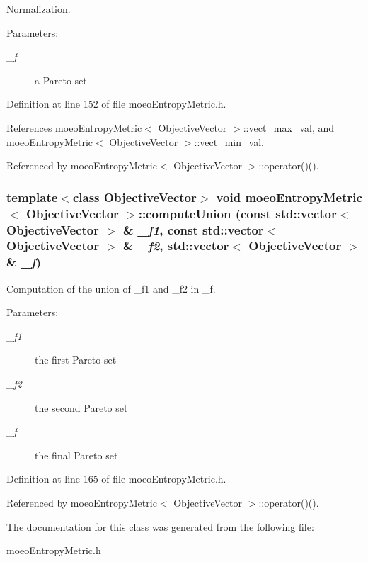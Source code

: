 Normalization. 

\begin{Desc}
\item[Parameters:]
\begin{description}
\item[{\em \_\-f}]a Pareto set \end{description}
\end{Desc}


Definition at line 152 of file moeo\-Entropy\-Metric.h.

References moeo\-Entropy\-Metric$<$ Objective\-Vector $>$::vect\_\-max\_\-val, and moeo\-Entropy\-Metric$<$ Objective\-Vector $>$::vect\_\-min\_\-val.

Referenced by moeo\-Entropy\-Metric$<$ Objective\-Vector $>$::operator()().
\subsubsection{\setlength{\rightskip}{0pt plus 5cm}template$<$class Objective\-Vector$>$ void \bf{moeo\-Entropy\-Metric}$<$ Objective\-Vector $>$::compute\-Union (const std::vector$<$ Objective\-Vector $>$ \& {\em \_\-f1}, const std::vector$<$ Objective\-Vector $>$ \& {\em \_\-f2}, std::vector$<$ Objective\-Vector $>$ \& {\em \_\-f})\hspace{0.3cm}{\tt  [inline, private]}}\label{classmoeoEntropyMetric_4b99c1842d780a89bda08e99a59e3e29}


Computation of the union of \_\-f1 and \_\-f2 in \_\-f. 

\begin{Desc}
\item[Parameters:]
\begin{description}
\item[{\em \_\-f1}]the first Pareto set \item[{\em \_\-f2}]the second Pareto set \item[{\em \_\-f}]the final Pareto set \end{description}
\end{Desc}


Definition at line 165 of file moeo\-Entropy\-Metric.h.

Referenced by moeo\-Entropy\-Metric$<$ Objective\-Vector $>$::operator()().

The documentation for this class was generated from the following file:\begin{CompactItemize}
\item 
moeo\-Entropy\-Metric.h\end{CompactItemize}
